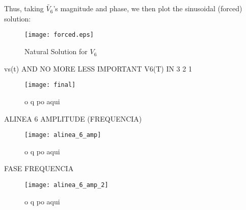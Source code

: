 Thus, taking $\tilde{V_6}$'s magnitude and phase, we then plot the sinusoidal (forced) solution:

\begin{figure}[H]
  \centering
  \texttt{[image: forced.eps]}
  \caption{Natural Solution for $V_{6}$}
  \label{fig:OctaveNaturalSolution}
\end{figure}

vs(t) AND NO MORE LESS IMPORTANT V6(T) IN 3 2 1

\begin{figure}[H]
  \centering
  \texttt{[image: final]}
  \caption{o q po aqui}
  \label{fig:fignodos}
\end{figure}



ALINEA 6
AMPLITUDE (FREQUENCIA)
\begin{figure}[H]
  \centering
  \texttt{[image: alinea\_6\_amp]}
  \caption{o q po aqui}
  \label{fig:fignodos}
\end{figure}


FASE FREQUENCIA
\begin{figure}[H]
  \centering
  \texttt{[image: alinea\_6\_amp\_2]}
  \caption{o q po aqui}
  \label{fig:fignodos}
\end{figure}
